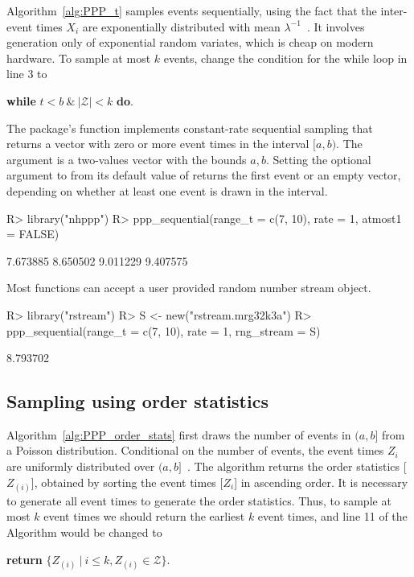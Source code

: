\documentclass[article,nojss]{jss}\usepackage[]{graphicx}\usepackage[]{xcolor}
\newcommand{\fct}[1]{\code{#1()}}
\begin{document}
Algorithm~\ref{alg:PPP_t} samples events sequentially, using the fact that the inter-event times $X_i$ are exponentially distributed with mean $\lambda^{-1}$~\cite[par. 4.1]{cox1965theory}. It involves generation only of exponential random variates, which is cheap on modern hardware. To sample at most $k$ events, change the condition for the while loop in line 3 to
\begin{center}
\textbf{while} {$t <b  \ \& \  |\mathcal{Z}| < k$} \textbf{do}.
\end{center}



The package's \fct{ppp\_sequential} function implements constant-rate sequential sampling that returns a vector with zero or more event times in the interval $[a, b)$. The  argument is a two-values vector with the bounds $a, b$. 
Setting the optional argument  to  from its default value of  returns the first event or an empty vector, depending on whether at least one event is drawn in the interval.

\begin{Schunk}
\begin{Sinput}
R> library("nhppp")
R> ppp_sequential(range_t = c(7, 10), rate = 1, atmost1 = FALSE)
\end{Sinput}
\begin{Soutput}
[1] 7.673885 8.650502 9.011229 9.407575
\end{Soutput}
\end{Schunk}

Most  functions can accept a user provided random number stream object.

\begin{Schunk}
\begin{Sinput}
R> library("rstream")
R> S <- new("rstream.mrg32k3a")
R> ppp_sequential(range_t = c(7, 10), rate = 1, rng_stream = S)
\end{Sinput}
\begin{Soutput}
[1] 8.793702
\end{Soutput}
\end{Schunk}


\subsection{Sampling using order statistics}\label{sec:PPP_order_stats}


Algorithm~\ref{alg:PPP_order_stats} first draws the number of events in $(a, b]$ from a Poisson distribution. Conditional on the number of events, the event times $Z_i$ are uniformly distributed over $(a, b]$~\cite[par. 4.1]{cox1965theory}. The algorithm returns the order statistics [$Z_{(i)}$], obtained by sorting the event times [$Z_i$] in ascending order. It is necessary to generate all event times to generate the order statistics. Thus, to sample at most $k$ event times we should return the earliest $k$ event times, and line 11 of the Algorithm would be changed to
\begin{center}
\textbf{return} {$\{Z_{(i)} \ | \ i \le k, Z_{(i)} \in \mathcal{Z}\}$}.
\end{center}
\end{document}
